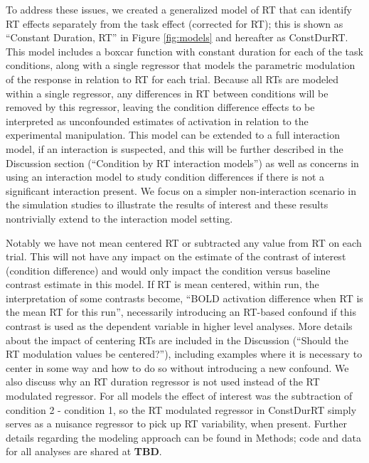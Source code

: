 \documentclass[titlepage,12pt] {article}
\begin{document}
To address these issues, we created a generalized model of RT that can identify RT effects separately from the task effect (corrected for RT); this is shown as ``Constant Duration, RT'' in Figure \ref{fig:models} and hereafter as ConstDurRT.  This model includes a boxcar function with constant duration for each of the task conditions, along with a single regressor that models the parametric modulation of the response in relation to RT for each trial. Because all RTs are modeled within a single regressor, any differences in RT between conditions will be removed by this regressor, leaving the condition difference effects to be interpreted as unconfounded estimates of activation in relation to the experimental manipulation. This model can be extended to a full interaction model, if an interaction is suspected, and this will be further described in the Discussion section (``Condition by RT interaction models'') as well as concerns in using an interaction model to study condition differences if there is not a significant interaction present.  We focus on a simpler non-interaction scenario in the simulation studies to illustrate the results of interest and these results nontrivially extend to the interaction model setting.

Notably we have not mean centered RT or subtracted any value from RT on each trial.  This will not have any impact on the estimate of the contrast of interest (condition difference) and would only impact the condition versus baseline contrast estimate in this model.  If RT is mean centered, within run, the interpretation of some contrasts become, ``BOLD activation difference when RT is the mean RT for this run'', necessarily introducing an RT-based confound if this contrast is used as the dependent variable in higher level analyses.  More details about the impact of centering RTs are included in the Discussion (``Should the RT modulation values be centered?''), including examples where it is necessary to center in some way and how to do so without introducing a new confound.  We also discuss why an RT duration regressor is not used instead of the RT modulated regressor. For all models the effect of interest was the subtraction of condition 2 - condition 1, so the RT modulated regressor in ConstDurRT simply serves as a nuisance regressor to pick up RT variability, when present.  Further details regarding the modeling approach can be found in Methods; code and data for all analyses are shared at \textbf{TBD}.
\end{document}
